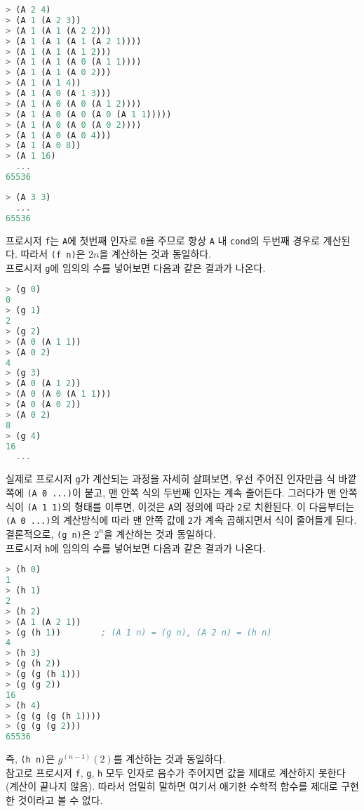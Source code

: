 \begin{lstlisting}[language=Scheme]
> (A 2 4)
> (A 1 (A 2 3))
> (A 1 (A 1 (A 2 2)))
> (A 1 (A 1 (A 1 (A 2 1))))
> (A 1 (A 1 (A 1 2)))
> (A 1 (A 1 (A 0 (A 1 1))))
> (A 1 (A 1 (A 0 2)))
> (A 1 (A 1 4))
> (A 1 (A 0 (A 1 3)))
> (A 1 (A 0 (A 0 (A 1 2))))
> (A 1 (A 0 (A 0 (A 0 (A 1 1)))))
> (A 1 (A 0 (A 0 (A 0 2))))
> (A 1 (A 0 (A 0 4)))
> (A 1 (A 0 8))
> (A 1 16)
  ...
65536
\end{lstlisting}

\begin{lstlisting}[language=Scheme]
> (A 3 3)
  ...
65536
\end{lstlisting}

프로시저 \texttt{f}는 \texttt{A}에 첫번째
인자로 \texttt{0}을 주므로 항상 \texttt{A} 내 \texttt{cond}의 두번째 경우로
계산된다. 따라서 \texttt{(f n)}은 $2n$을 계산하는 것과 동일하다.\\

프로시저 \texttt{g}에 임의의 수를 넣어보면 다음과 같은 결과가 나온다.

\begin{lstlisting}[language=Scheme]
> (g 0)
0
> (g 1)
2
> (g 2)
> (A 0 (A 1 1))
> (A 0 2)
4
> (g 3)
> (A 0 (A 1 2))
> (A 0 (A 0 (A 1 1)))
> (A 0 (A 0 2))
> (A 0 2)
8
> (g 4)
16
  ...
\end{lstlisting}

실제로 프로시저 \texttt{g}가 계산되는 과정을 자세히 살펴보면, 우선 주어진 인자만큼
식 바깥쪽에 \texttt{(A 0 ...)}이 붙고, 맨 안쪽 식의 두번째 인자는 계속
줄어든다. 그러다가 맨 안쪽 식이 \texttt{(A 1 1)}의 형태를 이루면, 이것은
\texttt{A}의 정의에 따라 \texttt{2}로 치환된다. 이 다음부터는 \texttt{(A 0
  ...)}의 계산방식에 따라 맨 안쪽 값에 \texttt{2}가 계속 곱해지면서 식이
줄어들게 된다. 결론적으로, \texttt{(g~n)}은 $2^n$을 계산하는 것과 동일하다.\\

프로시저 \texttt{h}에 임의의 수를 넣어보면 다음과 같은 결과가 나온다.

\begin{lstlisting}[language=Scheme]
> (h 0)
1
> (h 1)
2
> (h 2)
> (A 1 (A 2 1))
> (g (h 1))        ; (A 1 n) = (g n), (A 2 n) = (h n)
4
> (h 3)
> (g (h 2))
> (g (g (h 1)))
> (g (g 2))
16
> (h 4)
> (g (g (g (h 1))))
> (g (g (g 2)))
65536
\end{lstlisting}

즉, \texttt{(h~n)}은 $g^{(n-1)}(2)$를 계산하는 것과 동일하다.\\

참고로 프로시저 \texttt{f}, \texttt{g}, \texttt{h} 모두 인자로 음수가 주어지면
값을 제대로 계산하지 못한다 (계산이 끝나지 않음). 따라서 엄밀히 말하면 여기서
애기한 수학적 함수를 제대로 구현한 것이라고 볼 수 없다.

